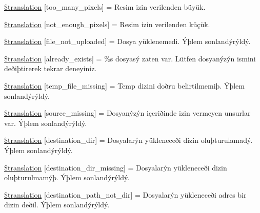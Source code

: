 \begin{DoxyCompactItemize}
\item 
\hyperlink{class_8upload_8tr___t_r_8php_aa4051ef64e94a3f8295c63cf85544016}{\$translation} \mbox{[}\textquotesingle{}too\+\_\+many\+\_\+pixels\textquotesingle{}\mbox{]} = \textquotesingle{}Resim izin verilenden büyük.\textquotesingle{}
\item 
\hyperlink{class_8upload_8tr___t_r_8php_a1fe342c27ce61f4ff4e0120ba647033e}{\$translation} \mbox{[}\textquotesingle{}not\+\_\+enough\+\_\+pixels\textquotesingle{}\mbox{]} = \textquotesingle{}Resim izin verilenden küçük.\textquotesingle{}
\item 
\hyperlink{class_8upload_8tr___t_r_8php_a4ce76e7be0b3a03c2b47f6d70c21832e}{\$translation} \mbox{[}\textquotesingle{}file\+\_\+not\+\_\+uploaded\textquotesingle{}\mbox{]} = \textquotesingle{}Dosya yüklenemedi. Ýþlem sonlandýrýldý.\textquotesingle{}
\item 
\hyperlink{class_8upload_8tr___t_r_8php_afd84e910217f04139f567c41e292afa5}{\$translation} \mbox{[}\textquotesingle{}already\+\_\+exists\textquotesingle{}\mbox{]} = \textquotesingle{}\%s dosyasý zaten var. Lütfen dosyanýzýn ismini deðiþtirerek tekrar deneyiniz.\textquotesingle{}
\item 
\hyperlink{class_8upload_8tr___t_r_8php_ab0fa87a88aba2624004581eed0633325}{\$translation} \mbox{[}\textquotesingle{}temp\+\_\+file\+\_\+missing\textquotesingle{}\mbox{]} = \textquotesingle{}Temp dizini doðru belirtilmemiþ. Ýþlem sonlandýrýldý.\textquotesingle{}
\item 
\hyperlink{class_8upload_8tr___t_r_8php_aceaaf7355acaaf10f0ae60378d03c468}{\$translation} \mbox{[}\textquotesingle{}source\+\_\+missing\textquotesingle{}\mbox{]} = \textquotesingle{}Dosyanýzýn içeriðinde izin vermeyen unsurlar var. Ýþlem sonlandýrýldý.\textquotesingle{}
\item 
\hyperlink{class_8upload_8tr___t_r_8php_aff2427c72a2598aefa6d58df1dd18b08}{\$translation} \mbox{[}\textquotesingle{}destination\+\_\+dir\textquotesingle{}\mbox{]} = \textquotesingle{}Dosyalarýn yükleneceði dizin oluþturulamadý. Ýþlem sonlandýrýldý.\textquotesingle{}
\item 
\hyperlink{class_8upload_8tr___t_r_8php_a9ef28d3cf09942c6c0a1e77fa09185e8}{\$translation} \mbox{[}\textquotesingle{}destination\+\_\+dir\+\_\+missing\textquotesingle{}\mbox{]} = \textquotesingle{}Dosyalarýn yükleneceði dizin oluþturulmamýþ. Ýþlem sonlandýrýldý.\textquotesingle{}
\item 
\hyperlink{class_8upload_8tr___t_r_8php_a5704a67137126e8c87b7a364175929d4}{\$translation} \mbox{[}\textquotesingle{}destination\+\_\+path\+\_\+not\+\_\+dir\textquotesingle{}\mbox{]} = \textquotesingle{}Dosyalarýn yükleneceði adres bir dizin deðil. Ýþlem sonlandýrýldý.\textquotesingle{}

\end{DoxyCompactItemize}
